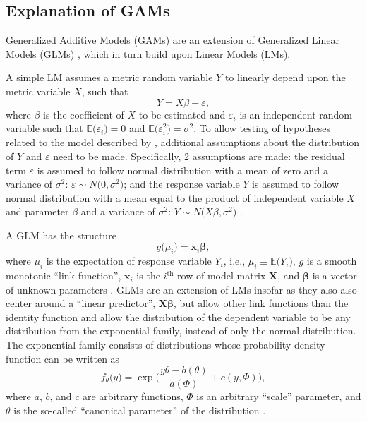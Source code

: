\subsection{Explanation of GAMs}

Generalized Additive Models (GAMs) \parencite{Wood2006,Hastie1991} are an extension of Generalized Linear Models (GLMs) \parencite{Nelder1972}, which in turn build upon Linear Models (LMs).

A simple LM assumes a metric random variable \(Y\) to linearly depend upon the metric variable \(X\), such that
\begin{equation}
  \label{eq:LinearModel}
  Y = X \beta + \varepsilon,
\end{equation}
where \(\beta\) is the coefficient of \(X\) to be estimated and \(\varepsilon_i\) is an independent random variable such that \(\mathbb{E}\bigl(\varepsilon_i\bigr) = 0\) and \(\mathbb{E}\bigl(\varepsilon_i^2\bigr) = \sigma^2\).  To allow testing of hypotheses related to the model described by , additional assumptions about the distribution of \(Y\) and \(\varepsilon\) need to be made.  Specifically, 2 assumptions are made: the residual term \(\varepsilon\) is assumed to follow normal distribution with a mean of zero and a variance of \(\sigma^2\): \(\varepsilon \sim N\bigl(0, \sigma^2\bigr)\); and the response variable \(Y\) is assumed to follow normal distribution with a mean equal to the product of independent variable \(X\) and parameter \(\beta\) and a variance of \(\sigma^2\): \(Y \sim N\bigl(X \beta, \sigma^2\bigr) \) \parencite{Wood2006,Burkschat2012}.

A GLM has the structure
\begin{equation}
  \label{eq:GeneralizedLinearModel}
  g\bigl(\mu_i\bigr) = \symbf{x}_i \symbf{\beta},
\end{equation}
where \(\mu_i\) is the expectation of response variable \(Y_i\), i.e., \(\mu_i \equiv \mathbb{E}\bigl(Y_i\bigr)\), \(g\) is a smooth monotonic ``link function'', \(\symbf{x}_i\) is the \(i^{\text{th}}\) row of model matrix \(\symbf{X}\), and \(\symbf{\beta}\) is a vector of unknown parameters \parencite{Wood2006,Nelder1972}.
GLMs are an extension of LMs insofar as they also also center around a ``linear predictor'', \(\symbf{X}\symbf{\beta}\), but allow other link functions than the identity function and allow the distribution of the dependent variable to be any distribution from the exponential family, instead of only the normal distribution.  The exponential family consists of distributions whose probability density function can be written as
\begin{equation}
  \label{eq:ExponentialFamilyProbabilityDensityFunction}
  f_{\theta}\bigl(y\bigr) = \exp \bigg( \frac{y \theta - b(\theta)}{a(\Phi)} + c(y, \Phi)\bigg),
\end{equation}
where \(a\), \(b\), and \(c\) are arbitrary functions, \(\Phi\) is an arbitrary ``scale'' parameter, and \(\theta\) is the so-called ``canonical parameter'' of the distribution \parencite{Wood2006}.

